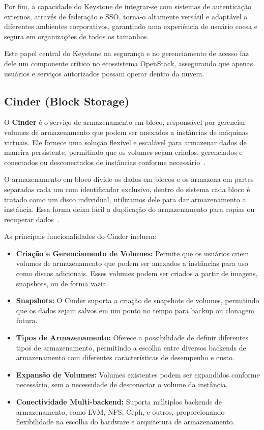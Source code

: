 Por fim, a capacidade do Keystone de integrar-se com sistemas de autenticação externos, através de federação e SSO, torna-o altamente versátil e adaptável a diferentes ambientes corporativos, garantindo uma experiência de usuário coesa e segura em organizações de todos os tamanhos.

Este papel central do Keystone na segurança e no gerenciamento de acesso faz dele um componente crítico no ecossistema OpenStack, assegurando que apenas usuários e serviços autorizados possam operar dentro da nuvem.


\subsection{Cinder (Block Storage)}

O \textbf{Cinder} é o serviço de armazenamento em bloco, responsável por gerenciar volumes de armazenamento que podem ser anexados a instâncias de máquinas virtuais. Ele fornece uma solução flexível e escalável para armazenar dados de maneira persistente, permitindo que os volumes sejam criados, gerenciados e conectados ou desconectados de instâncias conforme necessário~\citep{rosado2014overview}.

O armazenamento em bloco divide os dados em blocos e os armazena em partes separadas cada um com identificador exclusivo, dentro do sistema cada bloco é tratado como um disco individual, utilizamos dele para dar armazenamento a instância. Essa forma deixa fácil a duplicação do armazenamento para copias ou recuperar dados~\citep{BlockStorage}.

As principais funcionalidades do Cinder incluem:

\begin{itemize}
    \item \textbf{Criação e Gerenciamento de Volumes:} Permite que os usuários criem volumes de armazenamento que podem ser anexados a instâncias para uso como discos adicionais. Esses volumes podem ser criados a partir de imagens, snapshots, ou de forma vazia.
    \item \textbf{Snapshots:} O Cinder suporta a criação de snapshots de volumes, permitindo que os dados sejam salvos em um ponto no tempo para backup ou clonagem futura.
    \item \textbf{Tipos de Armazenamento:} Oferece a possibilidade de definir diferentes tipos de armazenamento, permitindo a escolha entre diversos backends de armazenamento com diferentes características de desempenho e custo.
    \item \textbf{Expansão de Volumes:} Volumes existentes podem ser expandidos conforme necessário, sem a necessidade de desconectar o volume da instância.
    \item \textbf{Conectividade Multi-backend:} Suporta múltiplos backends de armazenamento, como LVM, NFS, Ceph, e outros, proporcionando flexibilidade na escolha do hardware e arquitetura de armazenamento.
\end{itemize}


